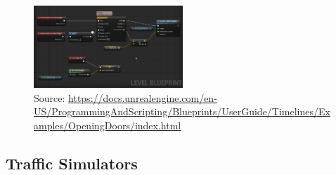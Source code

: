\begin{figure}[H] 
    \centering
    \includegraphics[width=0.5\textwidth]{OtherImages/UEBlueprint.png}
    \caption{Source: \url{https://docs.unrealengine.com/en-US/ProgrammingAndScripting/Blueprints/UserGuide/Timelines/Examples/OpeningDoors/index.html}}    \label{UnrealEngineBlueprint}

\end{figure}


\subsection{Traffic Simulators}
